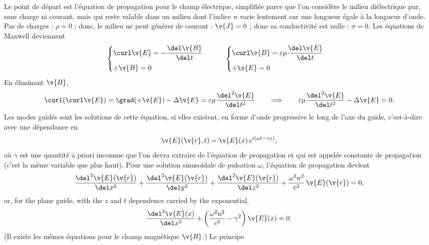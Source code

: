 Le point de départ est l'équation de propagation pour le champ électrique,
simplifiée parce que l'on considère le milieu diélectrique pur, sans charge ni
courant, mais qui reste valable dans un milieu dont l'indice $n$ varie
lentement sur une longueur égale à la longueur d'onde. Pas de charges :
$\rho = 0$ ; donc, le milieu ne peut générer de courant : $\v{J} = 0$ ; donc sa
conductivité est nulle : $\sigma = 0$. Les équations de Maxwell deviennent
\begin{equation*}
  \begin{cases}
    \curl \v{E} = -\dfrac{\del \v{B}}{\del t}\\[1.6ex]
    \div \v{B} = 0
  \end{cases}
  \qquad
  \begin{cases}
    \curl \v{B} = \varepsilon\mu\dfrac{\del \v{E}}{\del t}\\[1.6ex]
    \div \v{E} = 0
  \end{cases}
\end{equation*}
En éliminant $\v{B}$,
\begin{equation*}
  \curl(\curl \v{E}) = \grad(\div \v{E}) - \Delta \v{E}
    = \varepsilon\mu\frac{\del^2 \v{E}}{\del t^2}
  \qquad\Longrightarrow\qquad
  \varepsilon\mu\frac{\del^2 \v{E}}{\del t^2} - \Delta \v{E} = 0 .
\end{equation*}
Les modes guidés sont les solutions de cette équation, si elles existent, en
forme d'onde progressive le long de l'axe du guide, c'est-à-dire avec une
dépendance en
\begin{equation*}
  \v{E}(\v{r},t) = \v{E}(x)\,e^{i(\omega t - \gamma z)},
\end{equation*}
où $\gamma$ est une quantité a priori inconnue que l'on devra extraire de
l'équation de propagation et qui est appelée constante de propagation (c'est
la même variable que plus haut). Pour une solution sinusoïdale de pulsation $\omega$,
l'équation de propagation devient
\begin{equation*}
  \frac{\del^2 \v{E}(\v{r})}{\del x^2}
  + \frac{\del^2 \v{E}(\v{r})}{\del y^2}
  + \frac{\del^2 \v{E}(\v{r})}{\del z^2}
  + \frac{\omega^2 n^2}{c^2}\,\v{E}(\v{r}) = 0,
\end{equation*}
or, for the plane guide, with the $z$ and $t$ dependence carried by the
exponential,
\begin{equation*}
  \frac{\del^2 \v{E}(x)}{\del x^2}
  + \left(\frac{\omega^2 n^2}{c^2} - \gamma^2\right)\v{E}(x) = 0 .
\end{equation*}
(Il existe les mêmes équations pour le champ magnétique $\v{B}$.) Le principe

